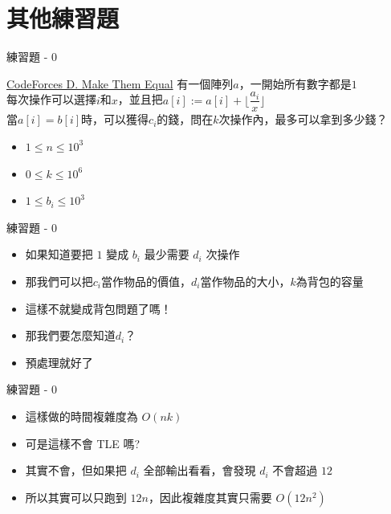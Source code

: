 \documentclass[aspectratio=169]{beamer}
\begin{document}
    \section{其他練習題}
    
    \begin{frame}{練習題 - 0}
        \begin{block}{\href{https://codeforces.com/contest/1633/problem/D}{CodeForces D. Make Them Equal}}
            有一個陣列$a$，一開始所有數字都是$1$\\
            \vspace{2mm}
            每次操作可以選擇$i$和$x$，並且把$a[i] := a[i] + \Big \lfloor \dfrac{a_i}{x} \Big \rfloor$　\\
            \vspace{2mm}
            當$a[i]=b[i]$時，可以獲得$c_i$的錢，問在$k$次操作內，最多可以拿到多少錢？
            \vspace{2mm}
            \begin{itemize}
                \item $1\leq n\leq 10^3$
                \item $0\leq k\leq 10^6$
                \item $1\leq b_i\leq 10^3$
            \end{itemize}
        \end{block}
    \end{frame}

    \begin{frame}{練習題 - 0}
        \begin{itemize}
            \item 如果知道要把 $1$ 變成 $b_i$ 最少需要 $d_i$ 次操作
            \item<2-> 那我們可以把$c_i$當作物品的價值，$d_i$當作物品的大小，$k$為背包的容量
            \item<3-> 這樣不就變成背包問題了嗎！
            \item<4-> 那我們要怎麼知道$d_i$？
            \item<5-> 預處理就好了
        \end{itemize}
    \end{frame}

    \begin{frame}{練習題 - 0}
        \begin{itemize}
            \item 這樣做的時間複雜度為 $O(nk)$
            \item 可是這樣不會 TLE 嗎?
            \item 其實不會，但如果把 $d_i$ 全部輸出看看，會發現 $d_i$ 不會超過 $12$
            \item 所以其實可以只跑到 $12n$，因此複雜度其實只需要 $O(12n^2)$
        \end{itemize}
    \end{frame}
\end{document}

